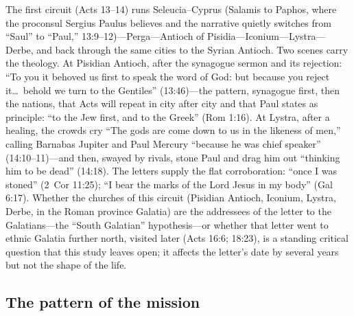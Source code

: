 The first circuit (Acts 13--14) runs Seleucia--Cyprus (Salamis to Paphos,
where the proconsul Sergius Paulus believes and the narrative quietly
switches from ``Saul'' to ``Paul,'' 13:9--12)---Perga---Antioch of
Pisidia---Iconium---Lystra---Derbe, and back through the same cities to
the Syrian Antioch. Two scenes carry the theology. At Pisidian Antioch,
after the synagogue sermon and its rejection: ``To you it behoved us
first to speak the word of God: but because you reject it\ldots\ behold we
turn to the Gentiles'' (13:46)---the pattern, synagogue first, then the
nations, that Acts will repeat in city after city and that Paul states as
principle: ``to the Jew first, and to the Greek'' (Rom 1:16). At Lystra,
after a healing, the crowds cry ``The gods are come down to us in the
likeness of men,'' calling Barnabas Jupiter and Paul Mercury ``because he
was chief speaker'' (14:10--11)---and then, swayed by rivals, stone Paul
and drag him out ``thinking him to be dead'' (14:18). The letters supply
the flat corroboration: ``once I was stoned'' (2~Cor 11:25); ``I bear the
marks of the Lord Jesus in my body'' (Gal 6:17). Whether the churches of
this circuit (Pisidian Antioch, Iconium, Lystra, Derbe, in the Roman
province Galatia) are the addressees of the letter to the Galatians---the
``South Galatian'' hypothesis---or whether that letter went to ethnic
Galatia further north, visited later (Acts 16:6; 18:23), is a standing
critical question that this study leaves open; it affects the letter's
date by several years but not the shape of the life.

\subsection{The pattern of the mission}

